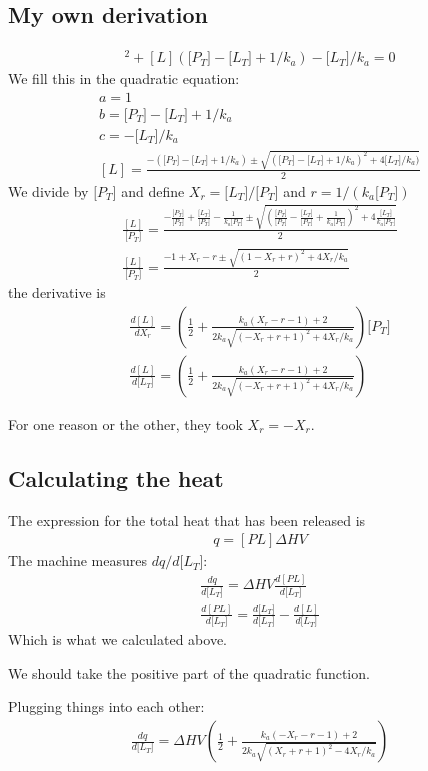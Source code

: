 \documentclass[11pt, fleqn]{report}
\newcommand{\lc}{[L]}
\newcommand{\plc}{[PL]}
\newcommand{\ka}{k_a}
\newcommand{\pcz}{\lbrack P_T\rbrack}
\newcommand{\lcz}{\lbrack L_T\rbrack}
\newcommand{\xr}{X_r}
\begin{document}
\subsection*{My own derivation}
\begin{eqnarray}
\lc^2 + \lc ( \pcz - \lcz + 1/\ka) - \lcz/\ka = 0 
\end{eqnarray}
We fill this in the quadratic equation:
\begin{eqnarray}
a=1\\
b=\pcz - \lcz + 1/\ka\\
c=-\lcz/\ka\\
\lc=\frac{-\left( \pcz-\lcz+1/\ka \right)\pm \sqrt{(\pcz-\lcz+1/\ka)^2+4\lcz/\ka)}}{2}
\end{eqnarray}
We divide by $\pcz$ and define $\xr=\lcz/\pcz$ and $r=1/(\ka\pcz)$
\begin{eqnarray}
\frac{\lc}{\pcz} = \frac{ -\frac{\pcz}{\pcz} + \frac{\lcz}{\pcz} - \frac{1}{\ka\pcz} \pm  \sqrt{\left( \frac{\pcz}{\pcz}-\frac{\lcz}{\pcz}+\frac{1}{\ka\pcz} \right)^2+4\frac{\lcz}{\ka\pcz}}}{2}\\
\frac{\lc}{\pcz} = \frac{-1 + \xr -r \pm \sqrt{(1 - \xr + r)^2+4\xr/\ka}}{2}
\end{eqnarray}
the derivative is
\begin{eqnarray}
\frac{d\lc}{d\xr} = \left( \frac{1}{2} + \frac{\ka(\xr-r-1)+2}{ 2\ka\sqrt{(-\xr+r+1)^2 + 4\xr/\ka} } \right) \pcz\\
\frac{d\lc}{d\lcz} = \left( \frac{1}{2} + \frac{\ka(\xr-r-1)+2}{ 2\ka\sqrt{(-\xr+r+1)^2 + 4\xr/\ka} } \right)
\end{eqnarray}

For one reason or the other, they took $X_r=-X_r$. 


\subsection*{Calculating the heat}

The expression for the total heat that has been released is
\begin{eqnarray}
q=\plc \Delta H V
\end{eqnarray}
The machine measures $d q /d \lcz$:
\begin{eqnarray}
\frac{d q}{d\lcz} = \Delta H V \frac{d\plc}{d\lcz} \\
\frac{d\plc}{d\lcz} = \frac{d\lcz}{d\lcz} - \frac{d\lc}{d\lcz} 
\end{eqnarray}
Which is what we calculated above.

We should take the positive part of the quadratic function.

Plugging things into each other:
\begin{eqnarray}
\frac{d q}{d\lcz} = \Delta H V \left( \frac{1}{2} + \frac{\ka(-\xr-r-1)+2}{ 2\ka\sqrt{(\xr+r+1)^2 - 4\xr/\ka} } \right)
\end{eqnarray}
\end{document}
